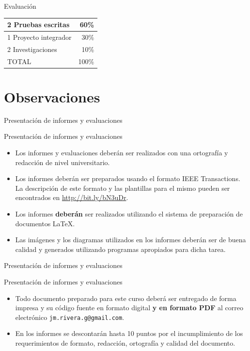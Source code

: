 \documentclass[handout,xcolor=dvipsnames]{beamer}
\newcommand{\pageframe}[1]{\frame{\begin{center}{ \Huge #1 }\end{center}}}
\begin{document}
\begin{frame}{Evaluación}
\begin{center}
\begin{tabular}{|l|r|}\hline
	2 Pruebas escritas	&	60\%\\\hline
	1 Proyecto integrador	&	30\%\\\hline
	2 Investigaciones	&	10\%\\\hline\hline
	TOTAL			&	100\%\\\hline
\end{tabular}
\end{center}
\end{frame}

\section{Observaciones}

\pageframe{Observaciones}


\begin{frame}{Presentación de informes y evaluaciones}
\begin{block}{Presentación de informes y evaluaciones}
  \begin{itemize}[<+->]
    \item Los informes y evaluaciones deberán ser realizados con una ortografía y redacción de nivel universitario.
    \item Los informes deberán ser preparados usando el formato IEEE Transactions. La descripción de este formato y las plantillas para el mismo pueden ser encontrados en \url{http://bit.ly/bN3uDr}.
    \item Los informes \textbf{deberán} ser realizados utilizando el sistema de preparación de documentos \LaTeX. 
    \item Las imágenes y los diagramas utilizados en los informes deberán ser de buena calidad y generados utilizando programas apropiados para dicha tarea.
  \end{itemize}
\end{block}
\end{frame}


\begin{frame}{Presentación de informes y evaluaciones}
\begin{block}{Presentación de informes y evaluaciones}
  \begin{itemize}[<+->]
    \item Todo documento preparado para este curso deberá ser entregado de forma impresa y su código fuente en formato digital \textbf{y en formato PDF} al correo electrónico \texttt{jm.rivera.g@gmail.com}.
    \item En los informes se descontarán hasta 10 puntos por el incumplimiento de los requerimientos de formato, redacción, ortografía y calidad del documento.
  \end{itemize}
\end{block}
\end{frame}
\end{document}
